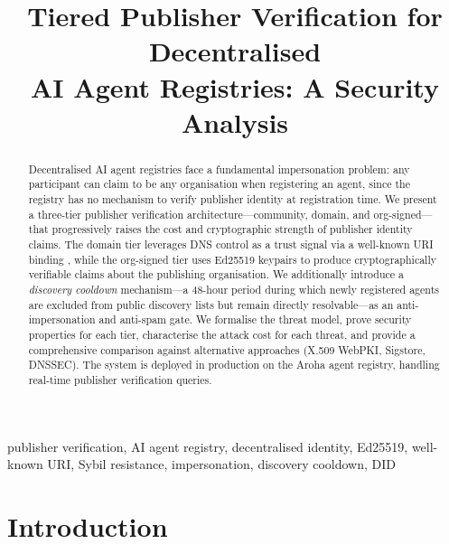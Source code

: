 \documentclass[conference]{IEEEtran}
\begin{document}
\title{Tiered Publisher Verification for Decentralised\\
       AI Agent Registries: A Security Analysis}

\author{
}

\maketitle

\begin{abstract}
Decentralised AI agent registries face a fundamental
impersonation problem: any participant can claim to be any
organisation when registering an agent, since the registry
has no mechanism to verify publisher identity at registration
time.  We present a three-tier publisher verification
architecture—community, domain, and org-signed—that
progressively raises the cost and cryptographic strength
of publisher identity claims. The domain tier leverages DNS
control as a trust signal via a well-known URI binding
\cite{rfc5785}, while the org-signed tier uses Ed25519
keypairs to produce cryptographically verifiable claims
about the publishing organisation.  We additionally introduce
a \emph{discovery cooldown} mechanism—a 48-hour period during
which newly registered agents are excluded from public
discovery lists but remain directly resolvable—as an
anti-impersonation and anti-spam gate.
We formalise the threat model, prove security properties for
each tier, characterise the attack cost for each threat, and
provide a comprehensive comparison against alternative
approaches (X.509 WebPKI, Sigstore, DNSSEC).  The system is
deployed in production on the Aroha agent registry, handling
real-time publisher verification queries.
\end{abstract}

\begin{IEEEkeywords}
publisher verification, AI agent registry, decentralised
identity, Ed25519, well-known URI, Sybil resistance,
impersonation, discovery cooldown, DID
\end{IEEEkeywords}

\section{Introduction}
\label{sec:intro}
\end{document}
